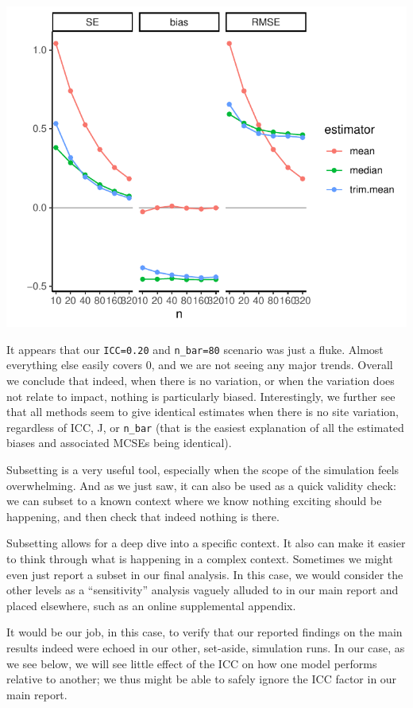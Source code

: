 \documentclass[
]{book}
\begin{document}
\begin{center}\includegraphics[width=0.75\linewidth]{Designing-Simulations-in-R_files/figure-latex/unnamed-chunk-172-1} \end{center}

It appears that our \texttt{ICC=0.20} and \texttt{n\_bar=80} scenario was just a fluke.
Almost everything else easily covers 0, and we are not seeing any major trends.
Overall we conclude that indeed, when there is no variation, or when the variation does not relate to impact, nothing is particularly biased.
Interestingly, we further see that all methods seem to give identical estimates when there is no site variation, regardless of ICC, J, or \texttt{n\_bar} (that is the easiest explanation of all the estimated biases and associated MCSEs being identical).

Subsetting is a very useful tool, especially when the scope of the simulation feels overwhelming.
And as we just saw, it can also be used as a quick validity check: we can subset to a known context where we know nothing exciting should be happening, and then check that indeed nothing is there.

Subsetting allows for a deep dive into a specific context.
It also can make it easier to think through what is happening in a complex context.
Sometimes we might even just report a subset in our final analysis.
In this case, we would consider the other levels as a ``sensitivity'' analysis vaguely alluded to in our main report and placed elsewhere, such as an online supplemental appendix.

It would be our job, in this case, to verify that our reported findings on the main results indeed were echoed in our other, set-aside, simulation runs.
In our case, as we see below, we will see little effect of the ICC on how one model performs relative to another; we thus might be able to safely ignore the ICC factor in our main report.
\end{document}
